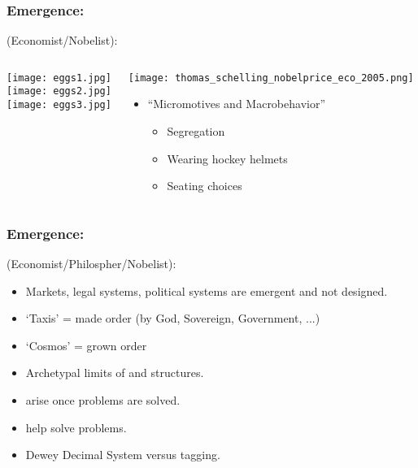 \begin{frame}
  \frametitle{Emergence:}

  \begin{block}{
      \smallskip
      (Economist/Nobelist):}
    \medskip
    \begin{columns}
      \texttt{[image: eggs1.jpg]}\\
      \texttt{[image: eggs2.jpg]}\\
      \texttt{[image: eggs3.jpg]}\\
      \begin{center}
      \texttt{[image: thomas\_schelling\_nobelprice\_eco\_2005.png]}
      \begin{itemize}
      \item 
        ``Micromotives and Macrobehavior''\cite{schelling1978a}
        \begin{itemize}
        \item
          Segregation\cite{schelling1971a,schelling2006a}
        \item
          Wearing hockey helmets\cite{schelling1973a}
        \item
          Seating choices
        \end{itemize}
      \end{itemize}
      \end{center}
    \end{columns}
  \end{block}

\end{frame}



\begin{frame}
  \frametitle{Emergence:}

  \begin{block}{
      \smallskip
      (Economist/Philospher/Nobelist):
    }
    \begin{itemize}
    \item<1-> Markets, legal systems, political systems are emergent and not designed.
    \item<2->   
      `Taxis' = made order (by God, Sovereign, Government, ...)
    \item<3->
      `Cosmos' = grown order
    \item<4->
      Archetypal limits of  and  structures.
    \item<5->
       arise once problems are solved.\cite{dodds2003c}
    \item<6->
       help solve problems.
    \item<7->
      Dewey Decimal System versus tagging.
    \end{itemize}
  \end{block}


\end{frame}

